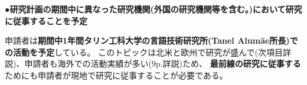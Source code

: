 {	\noindent
	●\textbf{研究計画の期間中に異なった研究機関(外国の研究機関等を含む。)において研究に従事することを予定}
	
	申請者は\textbf{期間中1年間タリン工科大学の言語技術研究所(Tanel Alumäe所長)での活動を予定}している。
	このトピックは北米と欧州で研究が盛んで(次項目詳説)、申請者も海外での活動実績が多い(9p.詳説)ため、
	\textbf{最前線の研究に従事する}ためにも申請者が現地で研究に従事することが必要である。

}

\newcommand{\人権の保護及び法令等の遵守への対応}{%
	コメント取得を予定してしているSNSはTwitterである。
	Twitter社は2020年3月より学術目的でTwitter APIの利用を自由化しているほか、
	取得したツイートIDを含む情報をデータセットとして公開することも学術目的であれば認められている\cite{twitter_2020}。

	また、先行研究が提供したデータセットを使用する場合は、提供者が示すライセンスやポリシーを遵守する。

	なお、学習済みモデルの公表は平成30年改正著作権法第30条4号により認められている。

	ただし、本研究では主観評価実験としてSNSユーザを対象としたアンケート調査を予定している。
	この調査により収集したデータは、個⼈の特定につながる情報を匿名化した上で解析を⾏い、
	解析結果の公表に際しては、匿名化を⾏ったデータを⽤い、個⼈情報の漏洩防⽌に配慮する。

	{\footnotesize
		\begin{thebibliography}{99}
			\setcounter{enumiv}{12}
			\bibitem{twitter_2020} Twitter開発者ポリシーを分かりやすくアップデート, 2020年3月11日. (最終閲覧日 2020年4月19日) \url{https://blog.twitter.com/developer/ja_jp/topics/tools/2020/DevPolicyUpdate.html}
		\end{thebibliography}
	}
}

